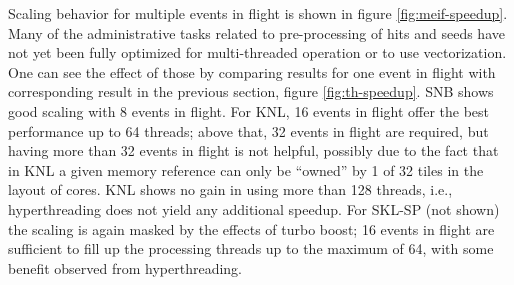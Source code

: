 \documentclass{webofc}
\begin{document}
Scaling behavior for multiple events in flight is shown in figure
\ref{fig:meif-speedup}. Many of the administrative tasks related to
pre-processing of hits and seeds have not yet been fully optimized for
multi-threaded operation or to use vectorization. One can see the effect of
those by comparing results for one event in flight with corresponding result in
the previous section, figure \ref{fig:th-speedup}. SNB shows good scaling with 8
events in flight. For KNL, 16 events in flight offer the best performance up to
64 threads; above that, 32 events in flight are required, but having more than
32 events in flight is not helpful, possibly due to the fact that in KNL a given
memory reference can only be ``owned'' by 1 of 32 tiles in the layout of cores.
KNL shows no gain in using more than 128 threads, i.e., hyperthreading does not
yield any additional speedup. For SKL-SP (not shown) the scaling is again masked by the
effects of turbo boost; 16 events in flight are sufficient to fill up the
processing threads up to the maximum of 64, with some benefit observed from
hyperthreading.
\end{document}

